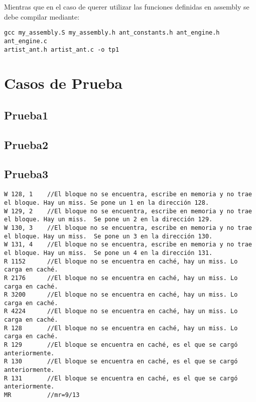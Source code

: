 \documentclass[a4paper, 10pt, twoside, notitlepage]{article}
\begin{document}
Mientras que en el caso de querer utilizar las funciones definidas en assembly se debe compilar mediante:

\begin{verbatim}
gcc my_assembly.S my_assembly.h ant_constants.h ant_engine.h ant_engine.c  
artist_ant.h artist_ant.c -o tp1
\end{verbatim}

\section{Casos de Prueba}

\subsection{Prueba1}

\subsection{Prueba2}

\subsection{Prueba3}

\begin{verbatim}
W 128, 1    //El bloque no se encuentra, escribe en memoria y no trae el bloque. Hay un miss. Se pone un 1 en la dirección 128. 
W 129, 2    //El bloque no se encuentra, escribe en memoria y no trae el bloque. Hay un miss.  Se pone un 2 en la dirección 129.
W 130, 3    //El bloque no se encuentra, escribe en memoria y no trae el bloque. Hay un miss.  Se pone un 3 en la dirección 130.
W 131, 4    //El bloque no se encuentra, escribe en memoria y no trae el bloque. Hay un miss.  Se pone un 4 en la dirección 131.
R 1152      //El bloque no se encuentra en caché, hay un miss. Lo carga en caché.
R 2176      //El bloque no se encuentra en caché, hay un miss. Lo carga en caché.
R 3200      //El bloque no se encuentra en caché, hay un miss. Lo carga en caché.
R 4224      //El bloque no se encuentra en caché, hay un miss. Lo carga en caché.
R 128       //El bloque no se encuentra en caché, hay un miss. Lo carga en caché.
R 129       //El bloque se encuentra en caché, es el que se cargó anteriormente.
R 130       //El bloque se encuentra en caché, es el que se cargó anteriormente.
R 131       //El bloque se encuentra en caché, es el que se cargó anteriormente.
MR          //mr=9/13
\end{verbatim}
\end{document}
